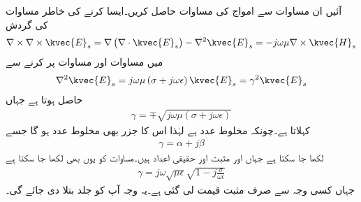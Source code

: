 آئیں ان مساوات سے امواج کی مساوات حاصل کریں۔ایسا کرنے کی خاطر مساوات  کی گردش
\begin{align*}
\nabla \times \nabla \times \kvec{E}_s=\nabla \left(\nabla \cdot \kvec{E}_s \right)-\nabla^2 \kvec{E}_s=-j \omega \mu  \nabla \times \kvec{H}_s
\end{align*}
میں مساوات  اور مساوات  پر کرنے سے
\begin{align}\label{مساوات_موج_ہلم_ہولٹز_مساوات}
\nabla^2 \kvec{E}_s=j \omega \mu  \left(\sigma +j \omega \epsilon \right) \kvec{E}_s =\gamma^2 \kvec{E}_s
\end{align}
حاصل ہوتا ہے  جہاں 
\begin{align}\label{مساوات_موج_حرکی_مستقل_الف}
\gamma=\mp \sqrt{j \omega \mu  \left(\sigma +j \omega \epsilon \right)}
\end{align}
 کہلاتا ہے۔چونکہ  مخلوط عدد ہے لہٰذا اس کا جزر  بھی مخلوط عدد ہو گا جسے
\begin{align}
\gamma=\alpha+j \beta
\end{align}
لکھا جا سکتا ہے جہاں  اور  مثبت اور حقیقی اعداد ہیں۔مساوات  کو یوں بھی لکھا جا سکتا ہے
\begin{align}\label{مساوات_موج_حرکی_مستقل_ب}
\gamma=j \omega \sqrt{\mu \epsilon }\sqrt{1-j \frac{\sigma}{\omega \epsilon}}
\end{align}
جہاں کسی وجہ سے صرف مثبت قیمت لی گئی ہے۔یہ وجہ آپ کو جلد بتلا دی جائے گی۔

